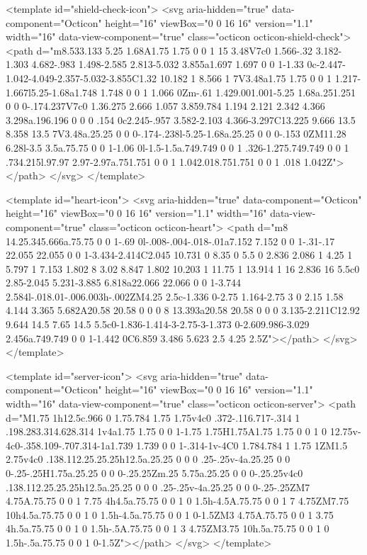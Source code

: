 <template id="shield-check-icon">
  <svg aria-hidden="true" data-component="Octicon" height="16" viewBox="0 0 16 16" version="1.1" width="16" data-view-component="true" class="octicon octicon-shield-check">
    <path d="m8.533.133 5.25 1.68A1.75 1.75 0 0 1 15 3.48V7c0 1.566-.32 3.182-1.303 4.682-.983 1.498-2.585 2.813-5.032 3.855a1.697 1.697 0 0 1-1.33 0c-2.447-1.042-4.049-2.357-5.032-3.855C1.32 10.182 1 8.566 1 7V3.48a1.75 1.75 0 0 1 1.217-1.667l5.25-1.68a1.748 1.748 0 0 1 1.066 0Zm-.61 1.429.001.001-5.25 1.68a.251.251 0 0 0-.174.237V7c0 1.36.275 2.666 1.057 3.859.784 1.194 2.121 2.342 4.366 3.298a.196.196 0 0 0 .154 0c2.245-.957 3.582-2.103 4.366-3.297C13.225 9.666 13.5 8.358 13.5 7V3.48a.25.25 0 0 0-.174-.238l-5.25-1.68a.25.25 0 0 0-.153 0ZM11.28 6.28l-3.5 3.5a.75.75 0 0 1-1.06 0l-1.5-1.5a.749.749 0 0 1 .326-1.275.749.749 0 0 1 .734.215l.97.97 2.97-2.97a.751.751 0 0 1 1.042.018.751.751 0 0 1 .018 1.042Z"></path>
</svg>
</template>

<template id="heart-icon">
  <svg aria-hidden="true" data-component="Octicon" height="16" viewBox="0 0 16 16" version="1.1" width="16" data-view-component="true" class="octicon octicon-heart">
    <path d="m8 14.25.345.666a.75.75 0 0 1-.69 0l-.008-.004-.018-.01a7.152 7.152 0 0 1-.31-.17 22.055 22.055 0 0 1-3.434-2.414C2.045 10.731 0 8.35 0 5.5 0 2.836 2.086 1 4.25 1 5.797 1 7.153 1.802 8 3.02 8.847 1.802 10.203 1 11.75 1 13.914 1 16 2.836 16 5.5c0 2.85-2.045 5.231-3.885 6.818a22.066 22.066 0 0 1-3.744 2.584l-.018.01-.006.003h-.002ZM4.25 2.5c-1.336 0-2.75 1.164-2.75 3 0 2.15 1.58 4.144 3.365 5.682A20.58 20.58 0 0 0 8 13.393a20.58 20.58 0 0 0 3.135-2.211C12.92 9.644 14.5 7.65 14.5 5.5c0-1.836-1.414-3-2.75-3-1.373 0-2.609.986-3.029 2.456a.749.749 0 0 1-1.442 0C6.859 3.486 5.623 2.5 4.25 2.5Z"></path>
</svg>
</template>

<template id="server-icon">
  <svg aria-hidden="true" data-component="Octicon" height="16" viewBox="0 0 16 16" version="1.1" width="16" data-view-component="true" class="octicon octicon-server">
    <path d="M1.75 1h12.5c.966 0 1.75.784 1.75 1.75v4c0 .372-.116.717-.314 1 .198.283.314.628.314 1v4a1.75 1.75 0 0 1-1.75 1.75H1.75A1.75 1.75 0 0 1 0 12.75v-4c0-.358.109-.707.314-1a1.739 1.739 0 0 1-.314-1v-4C0 1.784.784 1 1.75 1ZM1.5 2.75v4c0 .138.112.25.25.25h12.5a.25.25 0 0 0 .25-.25v-4a.25.25 0 0 0-.25-.25H1.75a.25.25 0 0 0-.25.25Zm.25 5.75a.25.25 0 0 0-.25.25v4c0 .138.112.25.25.25h12.5a.25.25 0 0 0 .25-.25v-4a.25.25 0 0 0-.25-.25ZM7 4.75A.75.75 0 0 1 7.75 4h4.5a.75.75 0 0 1 0 1.5h-4.5A.75.75 0 0 1 7 4.75ZM7.75 10h4.5a.75.75 0 0 1 0 1.5h-4.5a.75.75 0 0 1 0-1.5ZM3 4.75A.75.75 0 0 1 3.75 4h.5a.75.75 0 0 1 0 1.5h-.5A.75.75 0 0 1 3 4.75ZM3.75 10h.5a.75.75 0 0 1 0 1.5h-.5a.75.75 0 0 1 0-1.5Z"></path>
</svg>
</template>

